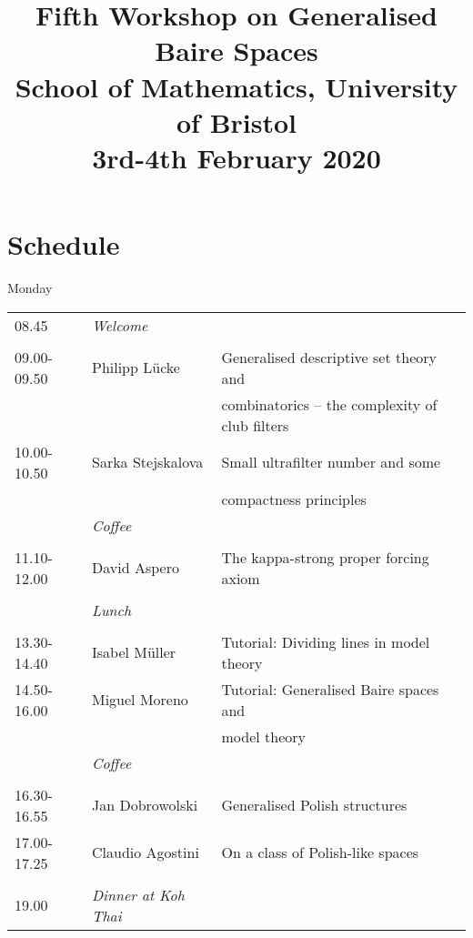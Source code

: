\documentclass[a4paper]{amsart}
\title[Workshop on generalised Baire spaces]{Fifth Workshop on Generalised Baire Spaces \\ 
School of Mathematics, University of Bristol \\ 
3rd-4th February 2020}
\theoremstyle{remark}
\begin{document}

\maketitle

\section*{Schedule} 

\begin{center} 
Monday 
\end{center} 

\bigskip 

\begin{tabular} 
{ l l l}
08.45  & \emph{Welcome} & \\ 
& & \\ 
09.00-09.50  & Philipp L\" ucke & Generalised descriptive set theory and \\ 
& & combinatorics -- the complexity of club filters \\ 
10.00-10.50 & Sarka Stejskalova & Small ultrafilter number and some \\
& & compactness principles \\ 
& \emph{Coffee} & \\ 
& & \\ 
11.10-12.00  & David Aspero & The kappa-strong proper forcing axiom \\ 
& & \\ 
 & \emph{Lunch} & \\ 
& & \\ 
13.30-14.40  & Isabel M\" uller & Tutorial: Dividing lines in model theory \\ 
14.50-16.00  & Miguel Moreno & Tutorial: Generalised Baire spaces and \\ 
 & & model theory \\ 
& \emph{Coffee} &  \\ 
& & \\ 
16.30-16.55  & Jan Dobrowolski & Generalised Polish structures \\ 
17.00-17.25  & Claudio Agostini & On a class of Polish-like spaces \\ 
& & \\ 
19.00  & \emph{Dinner at Koh Thai} & \\ 
\end{tabular} 
\end{document}
